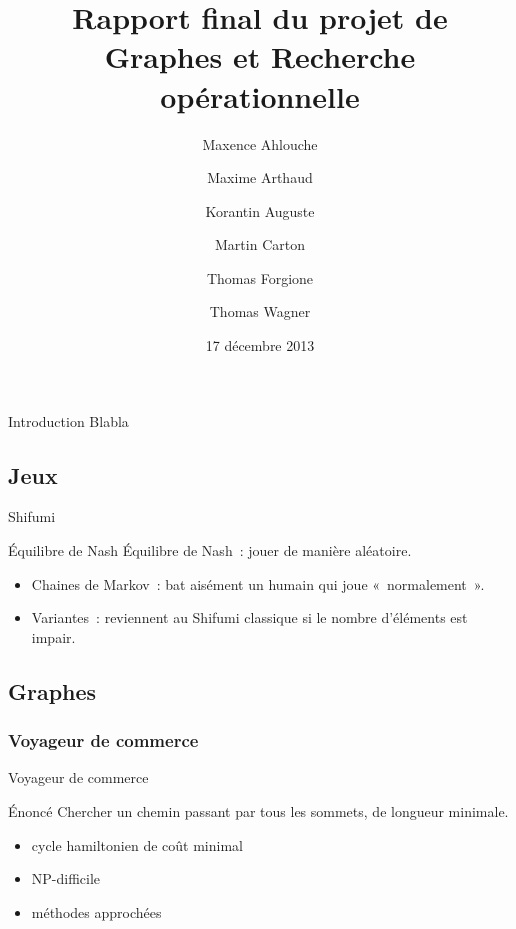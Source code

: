 \documentclass{beamer}
\title[Rapport final de GRO]
      {Rapport final du projet de\\Graphes et Recherche opérationnelle}
\institute{Enseeiht}
\author
  [Ahlouche \and Arthaud \and Auguste
    \and Carton \and Forgione \and Wagner]
  {Maxence Ahlouche \and Maxime Arthaud \and Korantin Auguste
    \and Martin Carton \and Thomas Forgione \and Thomas Wagner}
\date{17 décembre 2013}
\begin{document}
\begin{frame}
  \titlepage
\end{frame}

\begin{frame}{Introduction}
  Blabla
\end{frame}

\subsection{Jeux}

\begin{frame}{Shifumi}
    \begin{block}{Équilibre de Nash}
        Équilibre de Nash~: jouer de manière aléatoire.
    \end{block}

    \begin{itemize}
        \item Chaines de Markov~: bat aisément un humain qui joue «~normalement~».
        \item Variantes~: reviennent au Shifumi classique si le nombre d'éléments est impair.
    \end{itemize}
\end{frame}

\subsection{Graphes}

\subsubsection{Voyageur de commerce}

\begin{frame}{Voyageur de commerce}
\end{frame}

\begin{frame}{Énoncé}
    Chercher un chemin passant par tous les sommets, de longueur minimale.
    \begin{itemize}
        \item cycle hamiltonien de coût minimal
        \item NP-difficile
        \item méthodes approchées
    \end{itemize}
\end{frame}
\end{document}
